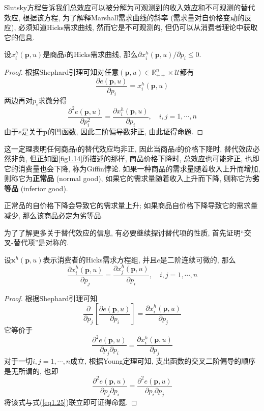 \documentclass[cn, 12pt, math=mtpro2, bibstyle=apa, blue, twocol]{elegantbook}
\newcommand{\R}{\mathbb{R}}
\newcommand{\p}{\mathbf{p}}
\newcommand{\x}{\mathbf{x}}
\begin{document}
Slutsky方程告诉我们总效应可以被分解为可观测到的收入效应和不可观测的替代效应, 根据该方程, 为了解释Marshall需求曲线的斜率 (需求量对自价格变动的反应), 必须知道Hicks需求曲线, 然而它是不可观测的, 但仍可以从消费者理论中获取它的信息.

\begin{theorem}
  设$x_i^h(\p,u)$是商品$i$的Hicks需求曲线, 那么$\partial x_i^h(\p,u)/\partial p_i\le0$.
\end{theorem}
\begin{proof}
  根据Shephard引理可知对任意$(\p,u)\in\R_{++}^n\times\mathcal{U}$都有
  $$\frac{\partial e(\p,u)}{\partial p_i}=x_i^h(\p,u)$$
  两边再对$p_i$求微分得
  $$\frac{\partial^2e(\p,u)}{\partial p_i^2}=\frac{\partial x_i^h(\p,u)}{\partial p_i},\quad i,j=1,\cdots,n$$
  由于$e$是关于$\p$的凹函数, 因此二阶偏导数非正, 由此证得命题.
\end{proof}
这一定理表明任何商品$i$的替代效应均非正, 因此当商品$i$的价格下降时, 替代效应必然非负, 但正如图\ref{fig1.14}所描述的那样, 商品价格下降时, 总效应也可能非正, 也即它的消费量也会下降, 称为Giffin悖论. 如果一种商品的需求量随着收入上升而增加, 则称它为\textbf{正常品} (normal good), 如果它的需求量随着收入上升而下降, 则称它为\textbf{劣等品} (inferior good).

\begin{corollary}
正常品的自价格下降会导致它的需求量上升; 如果商品自价格下降导致它的需求量减少, 那么该商品必定为劣等品.
\end{corollary}

为了了解更多关于替代效应的信息, 有必要继续探讨替代项的性质, 首先证明“交叉-替代项”是对称的.

\begin{proposition}\label{pro:pro1.3}
设$\x^h(\p,u)$表示消费者的Hicks需求方程组, 并且$e$是二阶连续可微的, 那么
$$\frac{\partial x_i^h(\p,u)}{\partial p_j}=\frac{\partial x_j^h(\p,u)}{\partial p_i},\quad i,j=1,\cdots,n$$
\end{proposition}
\begin{proof}
  根据Shephard引理可知
  $$\frac{\partial}{\partial p_j}\left[\frac{\partial e(\p,u)}{\partial p_i}\right]=\frac{\partial x_i^h(\p,u)}{\partial p_j}$$
  它等价于
  \begin{equation}\label{eq1.25}
    \frac{\partial^2e(\p,u)}{\partial p_j\partial p_i}=\frac{\partial x_i^h(\p,u)}{\partial p_j}
  \end{equation}
  对于一切$i,j=1,\cdots,n$成立, 根据Young定理可知, 支出函数的交叉二阶偏导的顺序是无所谓的, 也即
  $$\frac{\partial^2e(\p,u)}{\partial p_j\partial p_i}=\frac{\partial^2e(\p,u)}{\partial p_i\partial p_j}$$
  将该式与式(\ref{eq1.25})联立即可证得命题.
\end{proof}
\end{document}
